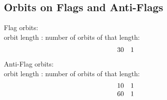 \subsection*{Orbits on Flags and Anti-Flags}
Flag orbits:\\
orbit length : number of orbits of that length:\\
$$
\begin{array}{*{2}c}
30  & 1\\
\end{array}
$$
Anti-Flag orbits:\\
orbit length : number of orbits of that length:\\
$$
\begin{array}{*{2}c}
10  & 1\\
60  & 1\\
\end{array}
$$
